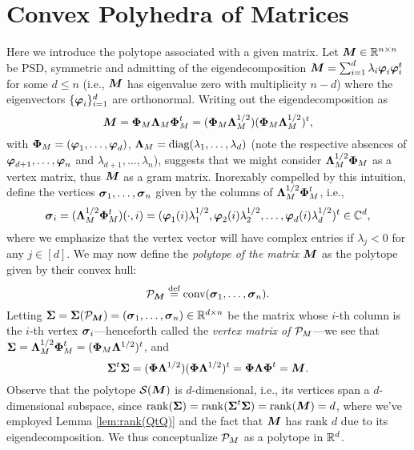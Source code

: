 \section{Convex Polyhedra of Matrices}
\label{sec:correspondence_polyhedra_matrices}
Here we introduce the polytope associated with a given matrix. Let $\M\in \R^{n\times n}$ be PSD,  symmetric and admitting of the eigendecomposition $\M=\sum_{i=1}^d \lambda_i \eig_i\eig_i^\tp$ for some $d\leq n$ (i.e., $\M$ has eigenvalue zero with multiplicity $n-d$) where the eigenvectors $\{\eig_i\}_{i=1}^d $ are orthonormal. Writing out the eigendecomposition as 
\begin{equation*}
\M=\Eig_M\Eval_M\Eig_M^\tp=(\Eig_M\Eval_M^{1/2})(\Eig_M\Eval_M^{1/2})^\tp,
\end{equation*}
with $\Eig_M = (\vp_1,\dots,\vp_d)$, $\Eval_M=\diag(\lambda_1,\dots,\lambda_d)$ (note the respective absences of $\vp_{d+1},\dots,\\\vp_n$ and $\lambda_{d+1},\dots,\lambda_n$), suggests that we might consider $\Eval_M^{1/2}\Eig_M$ as a vertex matrix, thus $\M$ as a gram matrix. 
Inorexably compelled by this intuition, define the vertices $\sv_1,\dots,\sv_n$ given by the columns of $\Eval_M^{1/2}\Eig_M^\tp$, i.e.,  
\begin{equation*}
    \sv_i = (\Eval_M^{1/2}\Eig_M^\tp) (\cdot,i) = (\eig_1(i)\lambda_1^{1/2}, \eig_2(i)\lambda_2^{1/2},\dots,\eig_d(i)\lambda_d^{1/2})^\tp\in \C^d,
\end{equation*}
where we emphasize that the vertex vector will have complex entries if $\lambda_j<0$ for any $j\in[d]$. We may now define the \emph{polytope of the matrix $\M$} as the polytope given by their convex hull:
\begin{equation*}
\pol_\M\equiv \conv(\sv_1,\dots,\sv_n).
\end{equation*}
Letting $\Sv=\Sv(\pol_\M)=(\sv_1,\dots,\sv_n)\in \R^{d\times n}$ be the matrix whose $i$-th column is the $i$-th vertex $\sv_i$---henceforth called the \emph{vertex matrix of $\P_M$}---we see that 
$ \Sv=\Eval_M^{1/2}\Eig_M^\tp=(\Eig_M\Eval^{1/2})^\tp$, and 
\begin{equation*}
    \Sv^\tp \Sv=(\Eig\Eval^{1/2}) (\Eig\Eval^{1/2})^\tp = \Eig \Eval\Eig^\tp =\M.
\end{equation*}
Observe that the polytope $\splx(\M)$ is $d$-dimensional, i.e., its vertices span a $d$-dimensional subspace, since
$\rank(\Sv)=\rank(\Sv^\tp \Sv)=\rank(\M)=d$, 
where we've employed Lemma \ref{lem:rank(QtQ)} and the fact that $\M$ has rank $d$ due to its eigendecomposition. We thus conceptualize $\P_M$ as a polytope in $\R^d$. 

